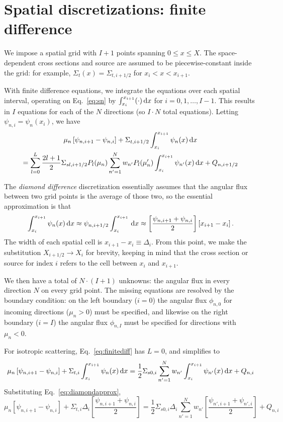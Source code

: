 \documentclass[]{SRJcommon}
\begin{document}
\section{Spatial discretizations: finite difference}
We impose a spatial grid with $I+1$ points spanning $0 \le x \le X$. The
space-dependent cross sections and source are assumed to be piecewise-constant
inside the grid: for example, $\Sigma_t(x) = \Sigma_{t,i+1/2}$ for $x_{i} < x
< x_{i+1}$.

With finite difference equations, we integrate the \SN{} equations over each
spatial interval, operating on Eq.~\eqref{eq:sn} by $\int_{x_{i}}^{x_{i+1}}
(\cdot) \, \mathrm{d} x$ for $i = 0,1,\ldots, I-1$.
This results in $I$ equations for each of the $N$ directions (so $I \cdot N$
total equations). Letting $\psi_{n,i} = \psi_n(x_i)$, we have
\begin{multline}
  \mu_n \left[ \psi_{n,i+1} - \psi_{n,i} \right] + \Sigma_{t,i+1/2}
  \int_{x_{i}}^{x_{i+1}} \psi_n(x) \, \mathrm{d} x
\\
= \sum_{l=0}^{L}  \frac{2l+1}{2} \Sigma_{sl,i+1/2} P_{l}(\mu_n)
 \sum_{n'=1}^{N} w_{n'} P_{l} (\mu_n') \int_{x_{i}}^{x_{i+1}} \psi_{n'}(x) \, \mathrm{d} x
  + Q_{n,i+1/2}
  \label{eq:finitediff}
\end{multline}

The \emph{diamond difference} discretization essentially assumes that the
angular flux between two grid points is the average of those two, so the
essential approximation is that
\begin{equation}
\int_{x_{i}}^{x_{i+1}} \psi_{n}(x) \, \mathrm{d} x
\approx \psi_{n,i+1/2} \int_{x_{i}}^{x_{i+1}}  \, \mathrm{d} x 
\approx  \left[ \frac{\psi_{n,i+1} + \psi_{n,i}}{2} \right] [x_{i+1} - x_{i}]
\,.
  \label{eq:diamondapprox}
\end{equation}
The width of each spatial cell is $x_{i+1} - x_{i} \equiv \Delta_i$. From this
point, we make the substitution $X_{i+1/2} \to X_{i}$ for brevity, keeping in
mind that the cross section or source for index $i$ refers to the cell between
$x_i$ and $x_{i+1}$.

We then have a total of $N\cdot(I+1)$ unknowns: the angular flux in every
direction $N$ on every grid point. The missing equations are resolved by the
boundary condition: on the left boundary ($i=0$) the angular flux $\phi_{n,0}$
for incoming directions ($\mu_n > 0$) must be specified, and likewise on the
right boundary ($i=I$) the angular flux $\phi_{n,I}$ must be specified
for directions with $\mu_n < 0$.

For isotropic scattering, Eq.~\eqref{eq:finitediff} has $L=0$, and simplifies to
$$
 \mu_n \left[ \psi_{n,i+1} - \psi_{n,i} \right] + \Sigma_{t,i}
  \int_{x_{i}}^{x_{i+1}} \psi_n(x) \, \mathrm{d} x
= \frac{1}{2} \Sigma_{s0,i} 
 \sum_{n'=1}^{N} w_{n'}  \int_{x_{i}}^{x_{i+1}} \psi_{n'}(x) \, \mathrm{d} x
  + Q_{n,i}
$$
Substituting Eq.~\eqref{eq:diamondapprox},
$$ 
\mu_n \left[ \psi_{n,i+1} - \psi_{n,i} \right]
+ \Sigma_{t,i} \Delta_i \left[ \frac{\psi_{n,i+1} + \psi_{n,i}}{2} \right]
=
\frac{1}{2} \Sigma_{s0,i} \Delta_i 
\sum_{n'=1}^{N} w_{n'} \left[ \frac{\psi_{n',i+1} + \psi_{n',i}}{2} \right]
  + Q_{n,i}
$$
\end{document}
